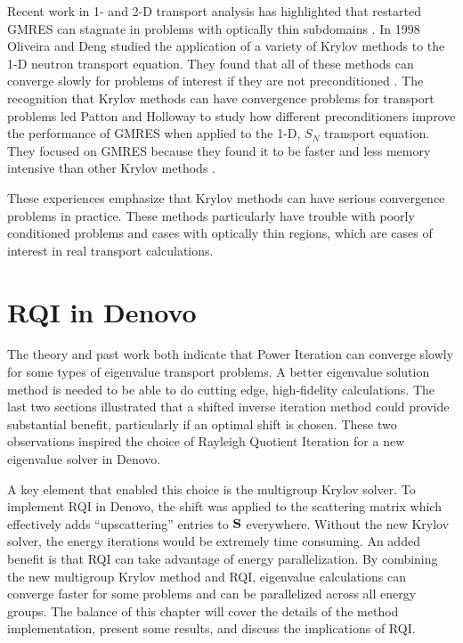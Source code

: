 Recent work in 1- and 2-D transport analysis has highlighted that restarted GMRES can stagnate in problems with optically thin subdomains \cite{Rosa2010}. In 1998 Oliveira and Deng studied the application of a variety of Krylov methods to the 1-D neutron transport equation. They found that all of these methods can converge slowly for problems of interest if they are not preconditioned \cite{Oliveira1998}. The recognition that Krylov methods can have convergence problems for transport problems led Patton and Holloway to study how different preconditioners improve the performance of GMRES when applied to the 1-D, $S_{N}$ transport equation. They focused on GMRES because they found it to be faster and less memory intensive than other Krylov methods \cite{Patton2002}. 

These experiences emphasize that Krylov methods can have serious convergence problems in practice. These methods particularly have trouble with poorly conditioned problems and cases with optically thin regions, which are cases of interest in real transport calculations.  

\section{RQI in Denovo}
The theory and past work both indicate that Power Iteration can converge slowly for some types of eigenvalue transport problems. A better eigenvalue solution method is needed to be able to do cutting edge, high-fidelity calculations. The last two sections illustrated that a shifted inverse iteration method could provide substantial benefit, particularly if an optimal shift is chosen. These two observations inspired the choice of Rayleigh Quotient Iteration for a new eigenvalue solver in Denovo. 

A key element that enabled this choice is the multigroup Krylov solver. To implement RQI in Denovo, the shift was applied to the scattering matrix which effectively adds ``upscattering'' entries to $\mathbf{S}$ everywhere. Without the new Krylov solver, the energy iterations would be extremely time consuming. An added benefit is that RQI can take advantage of energy parallelization. By combining the new multigroup Krylov method and RQI, eigenvalue calculations can converge faster for some problems and can be parallelized across all energy groups. The balance of this chapter will cover the details of the method implementation, present some results, and discuss the implications of RQI.

